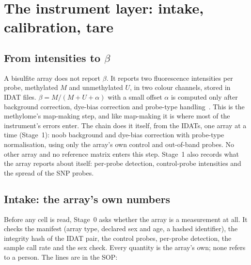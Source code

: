 \chapter{The instrument layer: intake, calibration, tare}\label{ch:instrument}

\section{From intensities to $\beta$}

A bisulfite array does not report $\beta$. It reports two fluorescence intensities per probe, methylated $M$ and unmethylated
$U$, in two colour channels, stored in IDAT files. $\beta=M/(M+U+\alpha)$ with a small offset $\alpha$ is computed only after
background correction, dye-bias correction and probe-type handling~\cite{Triche2013,Fortin2017}. This is the methylome's
map-making step, and like map-making it is where most of the instrument's errors enter. The chain does it itself, from the IDATs,
one array at a time (Stage~1): noob background and dye-bias correction with
probe-type normalisation, using only the array's own control and out-of-band probes. No other array and no reference matrix enters
this step. Stage~1 also records what the array reports about itself: per-probe detection, control-probe intensities and the spread of the
SNP probes.

\section{Intake: the array's own numbers}

Before any cell is read, Stage~0 asks whether the array is a measurement at all. It checks
the manifest (array type, declared sex and age, a hashed identifier), the integrity hash of the IDAT pair, the control probes, per-probe
detection, the sample call rate and the sex check. Every quantity is the array's own; none refers to a person. The lines are in the SOP:

